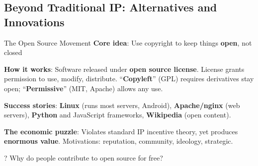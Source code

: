 \documentclass[aspectratio=169]{beamer}
\begin{document}
\subsection{Beyond Traditional IP: Alternatives and Innovations}

\begin{frame}{The Open Source Movement}
\textbf{Core idea}: Use copyright to keep things \textbf{open}, not closed

\vspace{0.2cm}
\textbf{How it works}: Software released under \textbf{open source license}. License grants permission to use, modify, distribute. ``\textbf{Copyleft}'' (GPL) requires derivatives stay open; ``\textbf{Permissive}'' (MIT, Apache) allows any use.

\vspace{0.2cm}
\textbf{Success stories}: \textbf{Linux} (runs most servers, Android), \textbf{Apache/nginx} (web servers), \textbf{Python} and JavaScript frameworks, \textbf{Wikipedia} (open content).

\vspace{0.2cm}
\textbf{The economic puzzle}: Violates standard IP incentive theory, yet produces \textbf{enormous value}. Motivations: reputation, community, ideology, strategic.

\begin{alertblock}{?}
Why do people contribute to open source for free?
\end{alertblock}
\end{frame}
\end{document}

